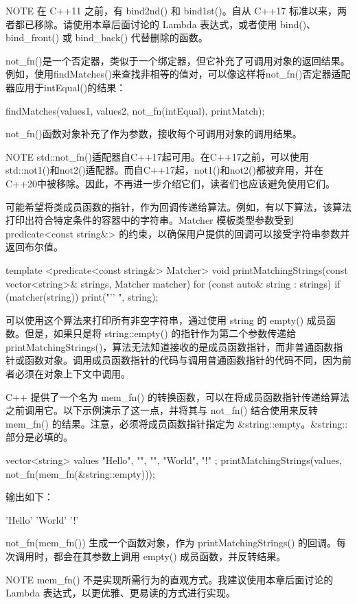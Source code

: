 \begin{myNotic}{NOTE}
在 C++11 之前，有 bind2nd() 和 bind1st()。自从 C++17 标准以来，两者都已移除。请使用本章后面讨论的 Lambda 表达式，或者使用 bind()、bind\_front() 或 bind\_back() 代替删除的函数。
\end{myNotic}


not\_fn()是一个否定器，类似于一个绑定器，但它补充了可调用对象的返回结果。例如，使用findMatches()来查找非相等的值对，可以像这样将not\_fn()否定器适配器应用于intEqual()的结果：

\begin{cpp}
findMatches(values1, values2, not_fn(intEqual), printMatch);
\end{cpp}

not\_fn()函数对象补充了作为参数，接收每个可调用对象的调用结果。

\begin{myNotic}{NOTE}
std::not\_fn()适配器自C++17起可用。在C++17之前，可以使用std::not1()和not2()适配器。而自C++17起，not1()和not2()都被弃用，并在C++20中被移除。因此，不再进一步介绍它们，读者们也应该避免使用它们。
\end{myNotic}


可能希望将类成员函数的指针，作为回调传递给算法。例如，有以下算法，该算法打印出符合特定条件的容器中的字符串。Matcher 模板类型参数受到 predicate<const string\&> 的约束，以确保用户提供的回调可以接受字符串参数并返回布尔值。

\begin{cpp}
template <predicate<const string&> Matcher>
void printMatchingStrings(const vector<string>& strings, Matcher matcher)
{
    for (const auto& string : strings) {
        if (matcher(string)) { print("'{}' ", string); }
    }
}
\end{cpp}

可以使用这个算法来打印所有非空字符串，通过使用 string 的 empty() 成员函数。但是，如果只是将 string::empty() 的指针作为第二个参数传递给 printMatchingStrings()，算法无法知道接收的是成员函数指针，而非普通函数指针或函数对象。调用成员函数指针的代码与调用普通函数指针的代码不同，因为前者必须在对象上下文中调用。

C++ 提供了一个名为 mem\_fn() 的转换函数，可以在将成员函数指针传递给算法之前调用它。以下示例演示了这一点，并将其与 not\_fn() 结合使用来反转 mem\_fn() 的结果。注意，必须将成员函数指针指定为 \&string::empty。\&string:: 部分是必填的。

\begin{cpp}
vector<string> values { "Hello", "", "", "World", "!" };
printMatchingStrings(values, not_fn(mem_fn(&string::empty)));
\end{cpp}

输出如下：

\begin{shell}
'Hello' 'World' '!'
\end{shell}

not\_fn(mem\_fn()) 生成一个函数对象，作为 printMatchingStrings() 的回调。每次调用时，都会在其参数上调用 empty() 成员函数，并反转结果。

\begin{myNotic}{NOTE}
mem\_fn() 不是实现所需行为的直观方式。我建议使用本章后面讨论的 Lambda 表达式，以更优雅、更易读的方式进行实现。
\end{myNotic}






